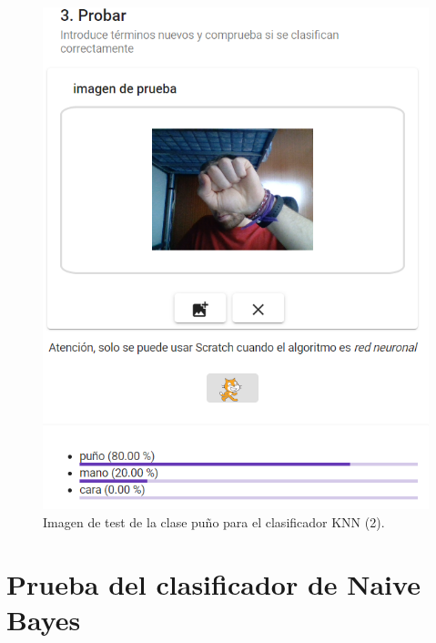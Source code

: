 \documentclass[a4paper, 12pt]{book}
\begin{document}
\begin{figure}
	\centering
	\includegraphics[width=12cm, keepaspectratio]{img/testpunoknnmal}
	\caption{Imagen de test de la clase puño para el clasificador KNN (2).}			
	\label{fig:testpunoknnmal}
\end{figure}












\section{Prueba del clasificador de Naive Bayes} 
\label{sec:pruebabayes}




\end{document}
